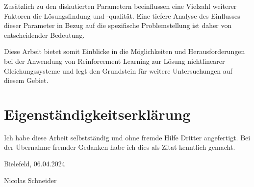 \documentclass{article}
\theoremstyle{newline}
\begin{document}
\begin{onehalfspace}
Zusätzlich zu den diskutierten Parametern beeinflussen eine Vielzahl weiterer Faktoren die Lösungsfindung und -qualität. Eine tiefere Analyse des Einflusses dieser Parameter in Bezug auf die spezifische Problemstellung ist daher von entscheidender Bedeutung.

Diese Arbeit bietet somit Einblicke in die Möglichkeiten und Herausforderungen bei der Anwendung von Reinforcement Learning zur Lösung nichtlinearer Gleichungssysteme und legt den Grundstein für weitere Untersuchungen auf diesem Gebiet. 


\newpage

\clearpage %


\printbibliography

\newpage

\section{Eigenständigkeitserklärung}

Ich habe diese Arbeit selbstständig und ohne fremde Hilfe Dritter angefertigt. Bei der Übernahme fremder Gedanken habe ich dies als Zitat kenntlich gemacht. 

Bielefeld, 06.04.2024

Nicolas Schneider

\end{onehalfspace}
\end{document}
